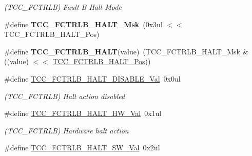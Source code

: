 \begin{DoxyCompactItemize}
\begin{DoxyCompactList}\small\item\em (T\+C\+C\+\_\+\+F\+C\+T\+R\+L\+B) Fault B Halt Mode \end{DoxyCompactList}\item 
\hypertarget{group___s_a_m_l21___t_c_c_ga6c2f6d5995862c1ed954616b9a45d682}{}\#define {\bfseries T\+C\+C\+\_\+\+F\+C\+T\+R\+L\+B\+\_\+\+H\+A\+L\+T\+\_\+\+Msk}~(0x3ul $<$$<$ T\+C\+C\+\_\+\+F\+C\+T\+R\+L\+B\+\_\+\+H\+A\+L\+T\+\_\+\+Pos)\label{group___s_a_m_l21___t_c_c_ga6c2f6d5995862c1ed954616b9a45d682}

\item 
\hypertarget{group___s_a_m_l21___t_c_c_ga58f6389686766647afd407442ee4b851}{}\#define {\bfseries T\+C\+C\+\_\+\+F\+C\+T\+R\+L\+B\+\_\+\+H\+A\+L\+T}(value)~(T\+C\+C\+\_\+\+F\+C\+T\+R\+L\+B\+\_\+\+H\+A\+L\+T\+\_\+\+Msk \& ((value) $<$$<$ \hyperlink{group___s_a_m_l21___t_c_c_gab9e9865f632211214654163efcbd704d}{T\+C\+C\+\_\+\+F\+C\+T\+R\+L\+B\+\_\+\+H\+A\+L\+T\+\_\+\+Pos}))\label{group___s_a_m_l21___t_c_c_ga58f6389686766647afd407442ee4b851}

\item 
\hypertarget{group___s_a_m_l21___t_c_c_ga70c37ab0f7e3ddff1a9397e9c90b7147}{}\#define \hyperlink{group___s_a_m_l21___t_c_c_ga70c37ab0f7e3ddff1a9397e9c90b7147}{T\+C\+C\+\_\+\+F\+C\+T\+R\+L\+B\+\_\+\+H\+A\+L\+T\+\_\+\+D\+I\+S\+A\+B\+L\+E\+\_\+\+Val}~0x0ul\label{group___s_a_m_l21___t_c_c_ga70c37ab0f7e3ddff1a9397e9c90b7147}

\begin{DoxyCompactList}\small\item\em (T\+C\+C\+\_\+\+F\+C\+T\+R\+L\+B) Halt action disabled \end{DoxyCompactList}\item 
\hypertarget{group___s_a_m_l21___t_c_c_ga589d49ba4c5715c9ed800ba9d7e47150}{}\#define \hyperlink{group___s_a_m_l21___t_c_c_ga589d49ba4c5715c9ed800ba9d7e47150}{T\+C\+C\+\_\+\+F\+C\+T\+R\+L\+B\+\_\+\+H\+A\+L\+T\+\_\+\+H\+W\+\_\+\+Val}~0x1ul\label{group___s_a_m_l21___t_c_c_ga589d49ba4c5715c9ed800ba9d7e47150}

\begin{DoxyCompactList}\small\item\em (T\+C\+C\+\_\+\+F\+C\+T\+R\+L\+B) Hardware halt action \end{DoxyCompactList}\item 
\hypertarget{group___s_a_m_l21___t_c_c_ga2b92db22efe86b620e2d072545cafb6a}{}\#define \hyperlink{group___s_a_m_l21___t_c_c_ga2b92db22efe86b620e2d072545cafb6a}{T\+C\+C\+\_\+\+F\+C\+T\+R\+L\+B\+\_\+\+H\+A\+L\+T\+\_\+\+S\+W\+\_\+\+Val}~0x2ul\label{group___s_a_m_l21___t_c_c_ga2b92db22efe86b620e2d072545cafb6a}


\end{DoxyCompactItemize}
